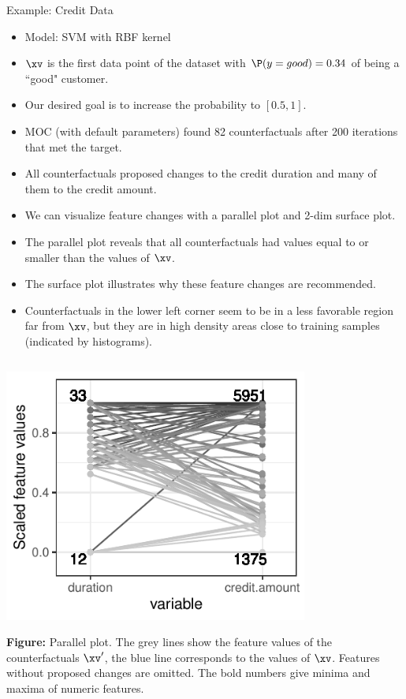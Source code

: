 \documentclass[11pt,compress,t,notes=noshow, xcolor=table]{beamer}
\begin{document}
\begin{vbframe}{Example: Credit Data}
	\begin{itemize}
		\item Model: SVM with RBF kernel
		\item $\xv$ is the first data point of the dataset with $\P(y = good)  = 0.34$ of being a ``good" customer.  
		\item Our desired goal is to increase the probability to $[0.5, 1]$.
		\item MOC (with default parameters) found 82 counterfactuals after 200 iterations that met the target.
		\item All counterfactuals proposed changes to the credit duration and many of them to the credit amount.  
		\item We can visualize feature changes with a parallel plot and 2-dim surface plot. 
		\item The parallel plot reveals that all counterfactuals had values equal to or smaller than the values of $\xv$.
		\item The surface plot illustrates why these feature changes are recommended. 
		\item Counterfactuals in the lower left corner seem to be in a less favorable region far from $\xv$, but they are in high density areas close to training samples (indicated by histograms).
	\end{itemize}
	\vspace{-0.7cm}
	\begin{columns}
				\begin{column}{0.5\textwidth}  
			\begin{center}
				\includegraphics[width=0.75\textwidth]{figure/counterfactuals_credit_parallel}
			\end{center}
		\vspace{-0.2cm}
			\scriptsize{\textbf{Figure:} Parallel plot. 
				The grey lines show the feature values of the counterfactuals $\xv'$, the blue line corresponds to the values of $\xv$. Features without proposed changes are omitted. The bold numbers give minima and maxima of numeric features.} 
			

\end{column}
\end{columns}
\end{vbframe}
\end{document}
